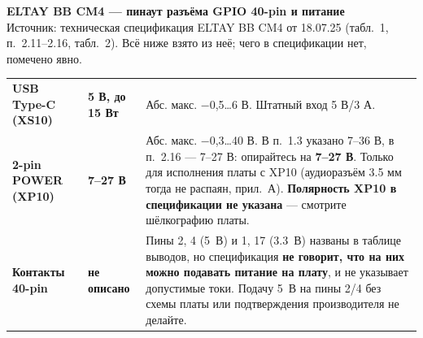 \documentclass[10pt,a4paper]{article}
\begin{document}
{\Large\bfseries ELTAY BB CM4 --- пинаут разъёма GPIO 40-pin и питание}\\[2pt]
{\footnotesize Источник: техническая спецификация ELTAY BB CM4 от 18.07.25 (табл.~1, п.~2.11--2.16, табл.~2). Всё ниже взято из неё; чего в спецификации нет, помечено явно.}

\vspace{4pt}
\begin{tcolorbox}[colback=red!5,colframe=red!60!black,title={\bfseries Как можно запитать плату (по спецификации)},fonttitle=\small,boxsep=2pt,left=4pt,right=4pt,top=2pt,bottom=2pt]
\footnotesize
\begin{tabular}{@{}p{3.7cm}p{2.7cm}p{10.1cm}@{}}
\bfseries USB Type-C (XS10) & \bfseries 5 В, до 15 Вт & Абс. макс. −0,5…6 В. Штатный вход 5 В/3 А. \\
\bfseries 2-pin POWER (XP10) & \bfseries 7--27 В & Абс. макс. −0,3…40 В. В п.~1.3 указано 7--36 В, в п.~2.16 --- 7--27 В: опирайтесь на \textbf{7--27 В}. Только для исполнения платы с XP10 (аудиоразъём 3.5 мм тогда не распаян, прил.~А). \textbf{Полярность XP10 в спецификации не указана} --- смотрите шёлкографию платы. \\
\bfseries Контакты 40-pin & \bfseries не описано & Пины 2, 4 (5~В) и 1, 17 (3.3~В) названы в таблице выводов, но спецификация \textbf{не говорит, что на них можно подавать питание на плату}, и не указывает допустимые токи. Подачу 5~В на пины 2/4 без схемы платы или подтверждения производителя не делайте. \\
\end{tabular}
\end{tcolorbox}
\end{document}
